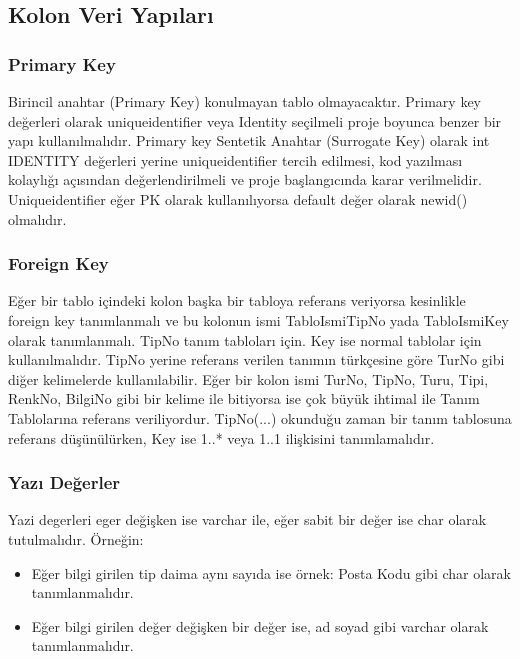 \documentclass[10pt,a4paper,draft]{article}
\begin{document}
\subsection{Kolon Veri Yapıları}

\subsubsection{Primary Key}

Birincil anahtar (Primary Key) konulmayan tablo olmayacaktır.
Primary key değerleri olarak uniqueidentifier veya Identity seçilmeli proje boyunca benzer bir yapı kullanılmalıdır.
Primary key Sentetik Anahtar (Surrogate Key) olarak int IDENTITY değerleri yerine uniqueidentifier tercih edilmesi,
kod yazılması kolaylığı açısından değerlendirilmeli ve proje başlangıcında karar verilmelidir.
Uniqueidentifier eğer PK olarak kullanılıyorsa default değer olarak newid() olmalıdır.

\subsubsection{Foreign Key}
Eğer bir tablo içindeki kolon başka bir tabloya referans veriyorsa 
kesinlikle foreign key tanımlanmalı ve bu			kolonun ismi TabloIsmiTipNo yada 
TabloIsmiKey olarak tanımlanmalı. TipNo tanım tabloları için. Key ise normal 
tablolar			için kullanılmalıdır.	
TipNo yerine referans verilen tanımın türkçesine göre TurNo
gibi diğer kelimelerde kullanılabilir.
Eğer bir kolon ismi TurNo, TipNo, Turu, Tipi, RenkNo, BilgiNo gibi bir kelime ile bitiyorsa ise çok büyük ihtimal ile Tanım Tablolarına referans veriliyordur.
TipNo(...) okunduğu zaman bir tanım tablosuna referans düşünülürken, Key ise   1..* veya 1..1 ilişkisini tanımlamalıdır.		 


\subsubsection{Yazı Değerler}
Yazi degerleri eger değişken ise varchar ile, eğer sabit bir değer ise char olarak tutulmalıdır. Örneğin:

\begin{itemize}
\item Eğer bilgi girilen tip daima aynı sayıda ise örnek: Posta Kodu gibi char olarak tanımlanmalıdır.		 
\item Eğer bilgi girilen değer değişken bir değer ise, ad soyad gibi varchar olarak tanımlanmalıdır.
\end{itemize} 
\end{document}

